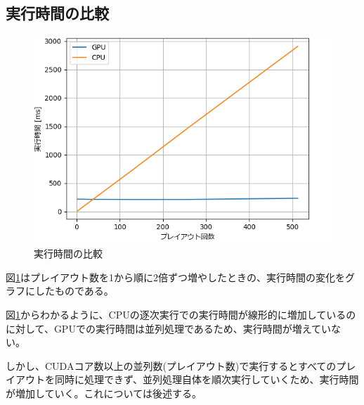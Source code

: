 \documentclass[10pt, a4paper]{jsarticle}
\begin{document}
\subsection{実行時間の比較}
\begin{figure}[ht]
    \begin{center}
        \includegraphics[width=12cm]{img/gpu_cpu_time.png}
        \caption{実行時間の比較}
        \label{fig:cpu_gpu_time}
    \end{center}
\end{figure}
\par 図\ref{fig:cpu_gpu_time}はプレイアウト数を1から順に2倍ずつ増やしたときの、実行時間の変化をグラフにしたものである。
\par 図\ref{fig:cpu_gpu_time}からわかるように、CPUの逐次実行での実行時間が線形的に増加しているのに対して、GPUでの実行時間は並列処理であるため、実行時間が増えていない。
\par しかし、CUDAコア数以上の並列数(プレイアウト数)で実行するとすべてのプレイアウトを同時に処理できず、並列処理自体を順次実行していくため、実行時間が増加していく。これについては後述する。
\end{document}
